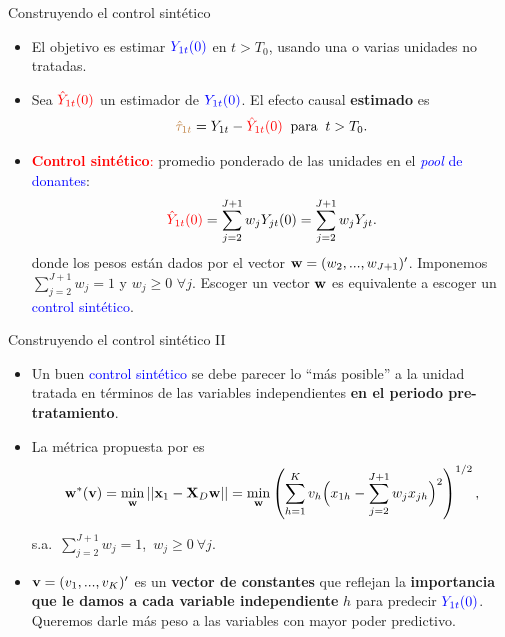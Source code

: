 \documentclass[10pt, xcolor=dvipsnames]{beamer}
\begin{document}
\begin{frame}{Construyendo el control sintético}
\begin{itemize}
    \item El objetivo es estimar $\textcolor{blue}{Y_{1t}(0)}$ en $t>T_0$, usando una o varias unidades no tratadas. \vspace{0.0cm}
    \item Sea $\textcolor{red}{\hat{Y}_{1t}(0)}$ un estimador de $\textcolor{blue}{Y_{1t}(0)}$. El efecto causal \textbf{estimado} es
    \begin{align*}
        \textcolor{brown}{\hat{\tau}_{1t}} = Y_{1t} - \textcolor{red}{\hat{Y}_{1t}(0)} \;\; \text{para} \;\; t>T_0.
    \end{align*}	
    \item \textcolor{red}{\textbf{Control sintético}:} promedio ponderado de las unidades en el \textcolor{blue}{\textit{pool} de donantes}:
    \begin{align*}
    \textcolor{red}{\hat{Y}_{1t}(0)} = \sum_{j=2}^{J+1} w_j Y_{jt}(0) = \sum_{j=2}^{J+1} w_j Y_{jt}. 
    \end{align*}	
    \noindent donde los pesos están dados por el vector $\textbf{w}=(w_2,...,w_{J+1})'$. Imponemos $\sum_{j=2}^{J+1} w_j=1$ y $w_j\geq0$ $\forall j$. Escoger un vector $\textbf{w}$ es equivalente a escoger un \textcolor{blue}{control sintético}.
\end{itemize}
\end{frame}


\begin{frame}{Construyendo el control sintético II}
\begin{itemize}\setlength{\itemsep}{1em}
    \item Un buen \textcolor{blue}{control sintético} se debe parecer lo ``más posible'' a la unidad tratada en términos de las variables independientes \textbf{en el periodo pre-tratamiento}. \\  \vspace{0.0cm}
    \item La métrica propuesta por \citet{abadie2003economic,abadie2010} es
    \begin{align*}
    \fontvie
        \wB^{*}(\vB) = \amin_{\wB} ||\xB_1-\XB_D\wB|| = \amin_{\wB} \left(\sum_{h=1}^{K} v_h \Big(x_{1h} - \sum_{j=2}^{J+1} w_j x_{jh}\Big)^2\right)^{1/2},
    \end{align*}
    \vspace{-1.2em}
    \begin{center}
    \fontvid
    s.a.\ $\sum_{j=2}^{J+1} w_j = 1$,\ $w_j \geq 0\ \forall j$.
    \end{center}
    \item $\textbf{v} = (v_1,...,v_K)'$ es un \textbf{vector de constantes} que reflejan la \textbf{importancia que le damos a cada variable independiente} $h$ para predecir $\textcolor{blue}{Y_{1t}(0)}$. Queremos darle más peso a las variables con mayor poder predictivo.
\end{itemize}
\end{frame}
\end{document}
